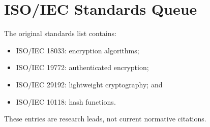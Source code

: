 \chapter{ISO/IEC Standards Queue}
\label{app:iso-iec-queue}


The original standards list contains:

\begin{itemize}
  \item ISO/IEC 18033: encryption algorithms;
  \item ISO/IEC 19772: authenticated encryption;
  \item ISO/IEC 29192: lightweight cryptography; and
  \item ISO/IEC 10118: hash functions.
\end{itemize}

These entries are research leads, not current normative citations.

